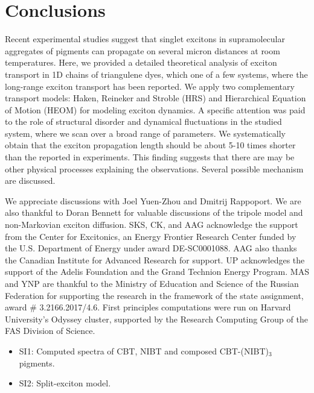\documentclass[journal=jacs,manuscript=article]{achemso}
\begin{document}
\section{Conclusions}
Recent experimental studies suggest that singlet excitons in supramolecular aggregates of pigments can propagate on several micron distances at room temperatures. Here, we provided a detailed theoretical analysis of exciton transport in 1D chains of triangulene dyes, which one of a few systems, where the long-range exciton transport has been reported. We apply two complementary transport models: Haken, Reineker and Stroble (HRS) and Hierarchical Equation of Motion (HEOM) for modeling exciton dynamics. A specific attention was paid to the role of structural disorder and dynamical fluctuations in the studied system, where we scan over a broad range of parameters. We systematically obtain that the exciton propagation length should be about 5-10 times shorter than the reported in experiments. This finding suggests that there are may be other physical processes explaining the observations. Several possible mechanism are discussed.

\begin{acknowledgement}

We appreciate discussions with Joel Yuen-Zhou and Dmitrij Rappoport. We are also thankful to Doran Bennett for valuable discussions of the tripole model and non-Markovian exciton diffusion. SKS, CK, and AAG acknowledge the support from the Center for Excitonics, an Energy Frontier Research Center funded by the U.S. Department of Energy under award DE-SC0001088. AAG also thanks the Canadian Institute for Advanced Research for support. UP acknowledges the support of the Adelis Foundation and the Grand Technion Energy Program. MAS and YNP are thankful to the Ministry of Education and Science of the Russian Federation for supporting the research in the framework of the state assignment, award \# 3.2166.2017/4.6. First principles computations were run on Harvard University's Odyssey cluster, supported by the Research Computing Group of the FAS Division of Science.

\end{acknowledgement}

\begin{suppinfo}

\begin{itemize}
  \item SI1: Computed spectra of CBT, NIBT and composed CBT-(NIBT)$_3$ pigments.
  \item SI2: Split-exciton model.
\end{itemize}

\end{suppinfo}


\end{document}
